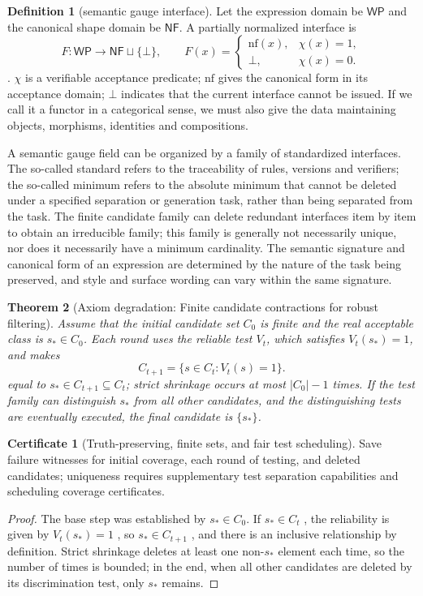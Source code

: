 \documentclass[11pt,a4paper]{article}
\theoremstyle{plain}
\newtheorem{theorem}{Theorem}[section]
\theoremstyle{definition}
\newtheorem{definition}[theorem]{Definition}
\newtheorem*{certificate}{Certificate}
\theoremstyle{remark}
\begin{document}
\begin{CJK*}
\begin{definition}
[semantic gauge interface]\label{fa:def-normalizer}
Let the expression domain be $\mathsf{WP}$ and the canonical shape domain be $\mathsf{NF}$. A partially normalized interface is \[
 F:\mathsf{WP}\to\mathsf{NF}\sqcup\{\bot\},\qquad
 F(x)=\begin{cases}\mathrm{nf}(x),&\chi(x)=1,\\\bot,&\chi(x)=0.\end{cases}
\]. $\chi$ is a verifiable acceptance predicate; $\mathrm{nf}$ gives the canonical form in its acceptance domain; $\bot$ indicates that the current interface cannot be issued. If we call it a functor in a categorical sense, we must also give the data maintaining objects, morphisms, identities and compositions.\end{definition}


A semantic gauge field can be organized by a family of standardized interfaces. The so-called standard refers to the traceability of rules, versions and verifiers; the so-called minimum refers to the absolute minimum that cannot be deleted under a specified separation or generation task, rather than being separated from the task. The finite candidate family can delete redundant interfaces item by item to obtain an irreducible family; this family is generally not necessarily unique, nor does it necessarily have a minimum cardinality. The semantic signature and canonical form of an expression are determined by the nature of the task being preserved, and style and surface wording can vary within the same signature. \cite{S11,S12}

\begin{theorem}
[Axiom degradation: Finite candidate contractions for robust filtering]\label{fa:thm-filter}
Assume that the initial candidate set $C_0$ is finite and the real acceptable class is $s_*\in C_0$. Each round uses the reliable test $V_t$, which satisfies $V_t(s_*)=1$, and makes \[
 C_{t+1}=\{s\in C_t:V_t(s)=1\}.
\] equal to $s_*\in C_{t+1}\subseteq C_t$; strict shrinkage occurs at most $|C_0|-1$ times. If the test family can distinguish $s_*$ from all other candidates, and the distinguishing tests are eventually executed, the final candidate is $\{s_*\}$.\end{theorem}
\begin{certificate}
[Truth-preserving, finite sets, and fair test scheduling]Save failure witnesses for initial coverage, each round of testing, and deleted candidates; uniqueness requires supplementary test separation capabilities and scheduling coverage certificates.\end{certificate}
\begin{proof}
The base step was established by $s_*\in C_0$. If $s_*\in C_t$ , the reliability is given by $V_t(s_*)=1$ , so $s_*\in C_{t+1}$ , and there is an inclusive relationship by definition. Strict shrinkage deletes at least one non-$s_*$ element each time, so the number of times is bounded; in the end, when all other candidates are deleted by its discrimination test, only $s_*$ remains.\end{proof}



\end{CJK*}
\end{document}
